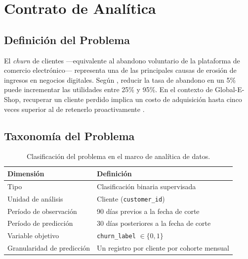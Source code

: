 \documentclass[12pt, letterpaper]{article}
\begin{document}
\tableofcontents
\newpage

\section{Contrato de Analítica}

\subsection{Definición del Problema}

El \textit{churn} de clientes —equivalente al abandono voluntario de la
plataforma de comercio electrónico— representa una de las principales causas
de erosión de ingresos en negocios digitales. Según \citet{reichheld1990zero},
reducir la tasa de abandono en un 5\% puede incrementar las utilidades entre
25\% y 95\%. En el contexto de Global-E-Shop, recuperar un cliente perdido
implica un costo de adquisición hasta cinco veces superior al de retenerlo
proactivamente \citep{kotler2016marketing}.

\subsection{Taxonomía del Problema}

\begin{table}[H]
\centering
\caption{Clasificación del problema en el marco de analítica de datos.}
\label{tab:taxonomy}
\begin{tabularx}{\textwidth}{lX}
\toprule
\textbf{Dimensión} & \textbf{Definición} \\
\midrule
Tipo & Clasificación binaria supervisada \\
Unidad de análisis & Cliente (\texttt{customer\_id}) \\
Período de observación & 90 días previos a la fecha de corte \\
Período de predicción & 30 días posteriores a la fecha de corte \\
Variable objetivo & \texttt{churn\_label} $\in \{0, 1\}$ \\
Granularidad de predicción & Un registro por cliente por cohorte mensual \\
\bottomrule
\end{tabularx}
\end{table}
\end{document}
